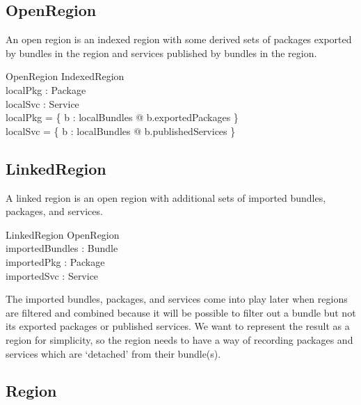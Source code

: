 \documentclass[a4paper,9pt,twoside]{article}
\begin{document}
\subsection{OpenRegion}

An open region is an indexed region with some derived sets of packages exported by bundles in the region
and services published by bundles in the region.

\begin{schema}{OpenRegion}
  IndexedRegion \\
  localPkg : \power Package \\
  localSvc : \power Service \\
\where
  localPkg = \bigcup \{ b : localBundles @ b.exportedPackages \} \\
  localSvc = \bigcup \{ b : localBundles @ b.publishedServices \} \\
\end{schema}

\subsection{LinkedRegion}

A linked region is an open region with additional sets of imported bundles, packages, and services.

\begin{schema}{LinkedRegion}
  OpenRegion \\
  importedBundles : \power Bundle \\
  importedPkg : \power Package \\
  importedSvc : \power Service \\  
\end{schema}
The imported bundles, packages, and services come into play later when regions are filtered and combined
because it will be possible to filter out a bundle but not its exported packages or published services.
We want to represent the result as a region for simplicity, so the region needs to have a way
of recording packages and services which are `detached' from their bundle(s).

\subsection{Region}
\end{document}
